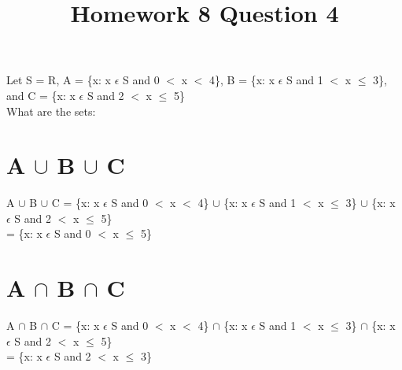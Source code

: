 \documentclass{article}
\title{Homework 8 Question 4}
\author{}
\date{}
\begin{document}
    \maketitle
    Let S = R, A = \{x: x $\epsilon$ S and 0 $<$ x $<$ 4\}, B = \{x: x $\epsilon$ S and 1 $<$ x $\leq$ 3\}, and C = \{x: x $\epsilon$ S and 2 $<$ x $\leq$ 5\}\\
    What are the sets:
    \section{A $\cup$ B $\cup$ C}
    A $\cup$ B $\cup$ C = \{x: x $\epsilon$ S and 0 $<$ x $<$ 4\} $\cup$ \{x: x $\epsilon$ S and 1 $<$ x $\leq$ 3\} $\cup$ \{x: x $\epsilon$ S and 2 $<$ x $\leq$ 5\}\\
    \indent\indent\indent\hspace{4pt} = \{x: x $\epsilon$ S and 0 $<$ x $\leq$ 5\}
    \section{A $\cap$ B $\cap$ C}
    A $\cap$ B $\cap$ C = \{x: x $\epsilon$ S and 0 $<$ x $<$ 4\} $\cap$ \{x: x $\epsilon$ S and 1 $<$ x $\leq$ 3\} $\cap$ \{x: x $\epsilon$ S and 2 $<$ x $\leq$ 5\}\\
    \indent\indent\indent\hspace{4pt} = \{x: x $\epsilon$ S and 2 $<$ x $\leq$ 3\}
\end{document}
